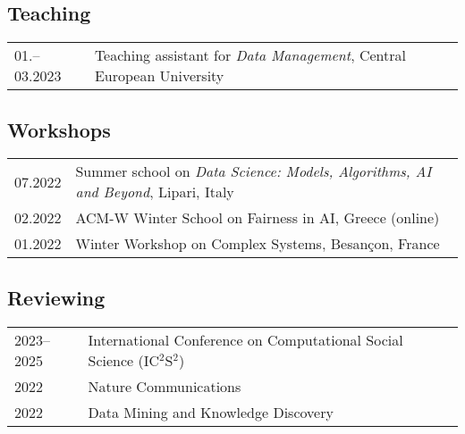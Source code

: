 \subsection*{Teaching}
\begin{longtable}[l]{@{}p{} p{}}
01.–03.2023 & Teaching assistant for \emph{Data Management}, Central European University\\
\end{longtable}


\subsection*{Workshops}
\begin{longtable}[l]{@{}p{} p{}}
    07.2022     & Summer school on \emph{Data Science: Models, Algorithms, AI and Beyond}, Lipari, Italy\\
    02.2022     & ACM-W Winter School on Fairness in AI, Greece (online)\\
    01.2022	    & Winter Workshop on Complex Systems, Besançon, France\\
\end{longtable}

\subsection*{Reviewing}
%
\begin{longtable}[l]{@{}p{} p{}}
    2023--2025 & International Conference on Computational Social Science (IC$^2$S$^2$) \\
    2022 & Nature Communications\\
    2022 & Data Mining and Knowledge Discovery\\
\end{longtable}



